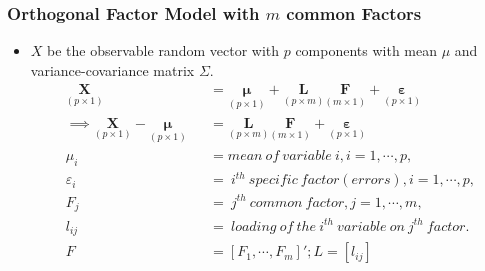 \documentclass[10pt]{beamer} %
\begin{document}
\begin{frame}
   \frametitle{Orthogonal Factor Model with $m$ common Factors}
   \begin{itemize}
      \item $X$ be the observable random vector with $p$ components with mean $\mu$ and variance-covariance matrix $\Sigma$. 	
         \begin{eqnarray}
            \underset{(p \times 1)}{\mathbf{X}} && =\underset{(p \times 1)}{\mathbf{\boldsymbol{\mu}}}+\underset{(p \times m)}{\mathbf{L}}\underset{(m \times 1)}{\mathbf{F}}+\underset{(p \times 1)}{\mathbf{\boldsymbol{\varepsilon}}} \nonumber \\
            \implies  \underset{(p \times 1)}{\mathbf{X}} - \underset{(p \times 1)}{\mathbf{\boldsymbol{\mu}}} && = \underset{(p \times m)}{\mathbf{L}}\underset{(m \times 1)}{\mathbf{F}}+\underset{(p \times 1)}{\mathbf{\boldsymbol{\varepsilon}}} \nonumber \\
            \mu_{i} && = mean\ of\ variable\ i, i = 1, \cdots, p, \nonumber \\ 
            \varepsilon_{i} && =\ i^{th}\ specific\ factor (errors), i = 1, \cdots, p, \nonumber \\ 
            F_{j} && =\ j^{th}\ common\ factor, j = 1, \cdots, m, \nonumber \\
            l_{ij} && =\ loading\ of\ the\ i^{th}\ variable\ on\ j^{th}\ factor.\nonumber \\
            F && = [F_1, \cdots, F_m]' ;  L = [l_{ij}] \nonumber 
         \end{eqnarray}
   \end{itemize}	

\end{frame}
\end{document}
